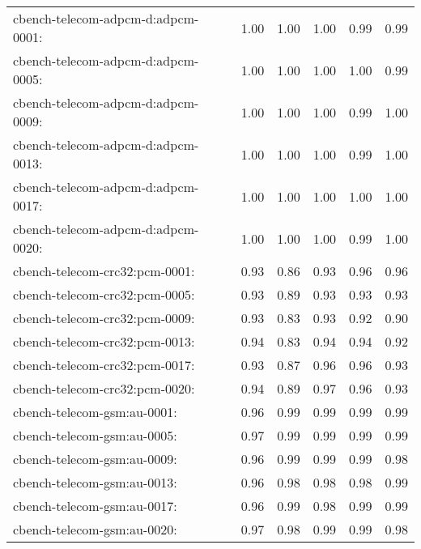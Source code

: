 \begin{table}
\begin{tabular}{lrrrrr}
cbench-telecom-adpcm-d:adpcm-0001: & 1.00 & 1.00 & 1.00 & 0.99 & 0.99 \\
cbench-telecom-adpcm-d:adpcm-0005: & 1.00 & 1.00 & 1.00 & 1.00 & 0.99 \\
cbench-telecom-adpcm-d:adpcm-0009: & 1.00 & 1.00 & 1.00 & 0.99 & 1.00 \\
cbench-telecom-adpcm-d:adpcm-0013: & 1.00 & 1.00 & 1.00 & 0.99 & 1.00 \\
cbench-telecom-adpcm-d:adpcm-0017: & 1.00 & 1.00 & 1.00 & 1.00 & 1.00 \\
cbench-telecom-adpcm-d:adpcm-0020: & 1.00 & 1.00 & 1.00 & 0.99 & 1.00 \\
cbench-telecom-crc32:pcm-0001: & 0.93 & 0.86 & 0.93 & 0.96 & 0.96 \\
cbench-telecom-crc32:pcm-0005: & 0.93 & 0.89 & 0.93 & 0.93 & 0.93 \\
cbench-telecom-crc32:pcm-0009: & 0.93 & 0.83 & 0.93 & 0.92 & 0.90 \\
cbench-telecom-crc32:pcm-0013: & 0.94 & 0.83 & 0.94 & 0.94 & 0.92 \\
cbench-telecom-crc32:pcm-0017: & 0.93 & 0.87 & 0.96 & 0.96 & 0.93 \\
cbench-telecom-crc32:pcm-0020: & 0.94 & 0.89 & 0.97 & 0.96 & 0.93 \\
cbench-telecom-gsm:au-0001: & 0.96 & 0.99 & 0.99 & 0.99 & 0.99 \\
cbench-telecom-gsm:au-0005: & 0.97 & 0.99 & 0.99 & 0.99 & 0.99 \\
cbench-telecom-gsm:au-0009: & 0.96 & 0.99 & 0.99 & 0.99 & 0.98 \\
cbench-telecom-gsm:au-0013: & 0.96 & 0.98 & 0.98 & 0.98 & 0.99 \\
cbench-telecom-gsm:au-0017: & 0.96 & 0.99 & 0.98 & 0.99 & 0.99 \\
cbench-telecom-gsm:au-0020: & 0.97 & 0.98 & 0.99 & 0.99 & 0.98 \\
\bottomrule
\end{tabular}
\end{table}
